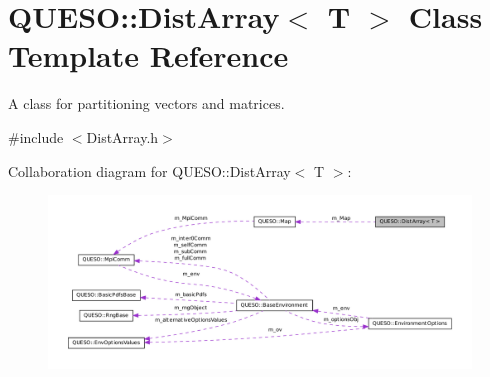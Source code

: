 \hypertarget{class_q_u_e_s_o_1_1_dist_array}{\section{Q\-U\-E\-S\-O\-:\-:Dist\-Array$<$ T $>$ Class Template Reference}
\label{class_q_u_e_s_o_1_1_dist_array}
}


A class for partitioning vectors and matrices.  




{\ttfamily \#include $<$Dist\-Array.\-h$>$}



Collaboration diagram for Q\-U\-E\-S\-O\-:\-:Dist\-Array$<$ T $>$\-:
\nopagebreak
\begin{figure}[H]
\begin{center}
\leavevmode
\includegraphics[width=350pt]{class_q_u_e_s_o_1_1_dist_array__coll__graph}
\end{center}
\end{figure}
